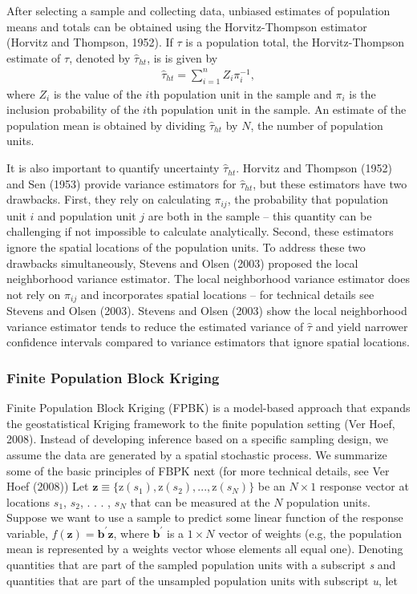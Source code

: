 \documentclass[]{elsarticle} %
\begin{document}
After selecting a sample and collecting data, unbiased estimates of
population means and totals can be obtained using the Horvitz-Thompson
estimator (Horvitz and Thompson, 1952). If \(\tau\) is a population
total, the Horvitz-Thompson estimate of \(\tau\), denoted by
\(\hat{\tau}_{ht}\), is is given by \begin{align}\label{eq:ht}
  \hat{\tau}_{ht} = \sum_{i = 1}^n Z_i \pi_i^{-1},
\end{align} where \(Z_i\) is the value of the \(i\)th population unit in
the sample and \(\pi_i\) is the inclusion probability of the \(i\)th
population unit in the sample. An estimate of the population mean is
obtained by dividing \(\hat{\tau}_{ht}\) by \(N\), the number of
population units.

It is also important to quantify uncertainty \(\hat{\tau}_{ht}\).
Horvitz and Thompson (1952) and Sen (1953) provide variance estimators
for \(\hat{\tau}_{ht}\), but these estimators have two drawbacks. First,
they rely on calculating \(\pi_{ij}\), the probability that population
unit \(i\) and population unit \(j\) are both in the sample -- this
quantity can be challenging if not impossible to calculate analytically.
Second, these estimators ignore the spatial locations of the population
units. To address these two drawbacks simultaneously, Stevens and Olsen
(2003) proposed the local neighborhood variance estimator. The local
neighborhood variance estimator does not rely on \(\pi_{ij}\) and
incorporates spatial locations -- for technical details see Stevens and
Olsen (2003). Stevens and Olsen (2003) show the local neighborhood
variance estimator tends to reduce the estimated variance of
\(\hat{\tau}\) and yield narrower confidence intervals compared to
variance estimators that ignore spatial locations.

\hypertarget{finite-population-block-kriging}{%
\subsubsection{Finite Population Block
Kriging}\label{finite-population-block-kriging}}

Finite Population Block Kriging (FPBK) is a model-based approach that
expands the geostatistical Kriging framework to the finite population
setting (Ver Hoef, 2008). Instead of developing inference based on a
specific sampling design, we assume the data are generated by a spatial
stochastic process. We summarize some of the basic principles of FBPK
next (for more technical details, see Ver Hoef (2008)) Let
\({\mathbf{z} \equiv \{\text{z}(s_1), \text{z}(s_2), . . . , \text{z}(s_N) \}}\)
be an \(N \times 1\) response vector at locations \(s_1\), \(s_2\), . .
. , \(s_N\) that can be measured at the \(N\) population units. Suppose
we want to use a sample to predict some linear function of the response
variable, \(f(\mathbf{z}) = \mathbf{b}^\prime \mathbf{z}\), where
\(\mathbf{b}^\prime\) is a \(1 \times N\) vector of weights (e.g, the
population mean is represented by a weights vector whose elements all
equal one). Denoting quantities that are part of the sampled population
units with a subscript \emph{s} and quantities that are part of the
unsampled population units with subscript \emph{u}, let
\end{document}
